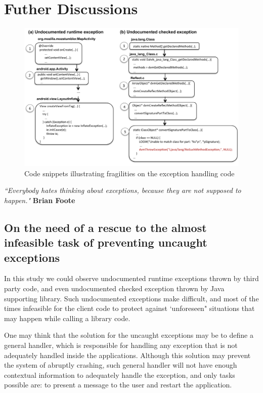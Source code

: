 \documentclass[conference]{IEEEtran}
\begin{document}
\section{Futher Discussions}

\begin{figure} \centering \includegraphics[scale=0.4]{codeexample2.pdf}
\caption{Code snippets illustrating fragilities on the exception handling code} \label{fig:exchier} \end{figure}


\emph{``Everybody hates thinking about exceptions, because they are not supposed to happen."}
\textbf{Brian Foote} 

\subsection{On the need of a rescue to the almost infeasible task of preventing uncaught exceptions}
In this study we could observe undocumented runtime exceptions thrown by third party code,
and even undocumented checked exception thrown by Java supporting library.
Such undocumented exceptions make difficult, and most of the times infeasible
for the client code to protect against `unforeseen" situations that may happen 
while calling a library code.

One may think that the solution for the uncaught exceptions 
may be to define a general handler, 
which is responsible for handling any exception that is not
adequately handled inside the applications. Although this 
solution may prevent  the system of abruptly crashing,
 such general handler will not have enough
contextual information to adequately handle the exception, 
and only tasks possible are: to present a message to the user
 and restart the application.
\end{document}
